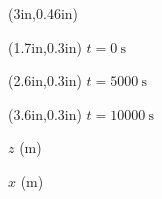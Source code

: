 \documentclass{article}
\begin{document}
\TPMargin{1pt}
\begin{textblock*}{1in}(3in,0.46in)
\end{textblock*}
\begin{textblock*}{8em}(1.7in,0.3in)
\normalsize
$t = \SI{0}{\second}$
\end{textblock*}
\begin{textblock*}{8em}(2.6in,0.3in)
\normalsize
$t = \SI{5000}{\second}$
\end{textblock*}
\begin{textblock*}{8em}(3.6in,0.3in)
\normalsize
$t = \SI{10000}{\second}$
\end{textblock*}

$z$ (\si{\meter}) 

\vspace*{0.3em}\hspace*{21em}$x$ (\si{\meter})
\end{document}
